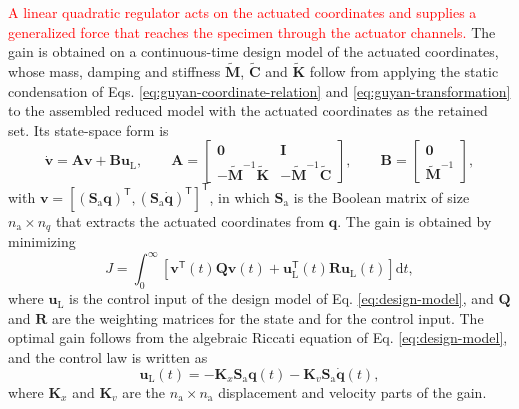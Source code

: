 \documentclass[11pt,a4paper]{article}
\numberwithin{equation}{section}
\newcommand{\rev}[1]{\textcolor{red}{#1}}
\begin{document}
\rev{A linear quadratic regulator acts on the actuated coordinates and supplies a generalized force that reaches the specimen through the actuator channels.} The gain is obtained on a continuous-time design model of the actuated coordinates, whose mass, damping and stiffness \(\widetilde{\mathbf{M}}\), \(\widetilde{\mathbf{C}}\) and \(\widetilde{\mathbf{K}}\) follow from applying the static condensation of Eqs. \eqref{eq:guyan-coordinate-relation} and \eqref{eq:guyan-transformation} to the assembled reduced model with the actuated coordinates as the retained set. Its state-space form is
\begin{equation}
	\dot{\bm{v}}=\mathbf{A}\bm{v}+\mathbf{B}\bm{u}_{\mathrm{L}},
	\qquad
	\mathbf{A}=
	\begin{bmatrix}
		\mathbf{0} & \mathbf{I}\\
		-\widetilde{\mathbf{M}}^{-1}\widetilde{\mathbf{K}}
		& -\widetilde{\mathbf{M}}^{-1}\widetilde{\mathbf{C}}
	\end{bmatrix},
	\qquad
	\mathbf{B}=
	\begin{bmatrix}
		\mathbf{0}\\
		\widetilde{\mathbf{M}}^{-1}
	\end{bmatrix},
	\label{eq:design-model}
\end{equation}
with \(\bm{v}=[(\mathbf{S}_{\mathrm{a}}\bm{q})^{\mathsf{T}},(\mathbf{S}_{\mathrm{a}}\dot{\bm{q}})^{\mathsf{T}}]^{\mathsf{T}}\), in which \(\mathbf{S}_{\mathrm{a}}\) is the Boolean matrix of size \(n_{\mathrm{a}}\times n_{q}\) that extracts the actuated coordinates from \(\bm{q}\). The gain is obtained by minimizing
\begin{equation}
	J=\int_{0}^{\infty}
	\left[
	\bm{v}^{\mathsf{T}}(t)\mathbf{Q}\bm{v}(t)
	+\bm{u}_{\mathrm{L}}^{\mathsf{T}}(t)\mathbf{R}\bm{u}_{\mathrm{L}}(t)
	\right]\mathrm{d}t,
	\label{eq:lqr-cost}
\end{equation}
where \(\bm{u}_{\mathrm{L}}\) is the control input of the design model of Eq. \eqref{eq:design-model}, and \(\mathbf{Q}\) and \(\mathbf{R}\) are the weighting matrices for the state and for the control input. The optimal gain follows from the algebraic Riccati equation of Eq. \eqref{eq:design-model}, and the control law is written as
\begin{equation}
	\bm{u}_{\mathrm{L}}(t)=
	-\mathbf{K}_{x}\mathbf{S}_{\mathrm{a}}\bm{q}(t)
	-\mathbf{K}_{v}\mathbf{S}_{\mathrm{a}}\dot{\bm{q}}(t),
	\label{eq:lqr-law}
\end{equation}
where \(\mathbf{K}_{x}\) and \(\mathbf{K}_{v}\) are the \(n_{\mathrm{a}}\times n_{\mathrm{a}}\) displacement and velocity parts of the gain.
\end{document}
